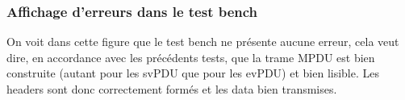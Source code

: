 \documentclass{report}
\begin{document}
\subsubsection{Affichage d'erreurs dans le test bench}
\label{subsection:NoErrors}
On voit dans cette figure que le test bench ne présente aucune erreur, cela veut dire, en accordance avec les précédents tests, que la trame MPDU est bien construite (autant pour les svPDU que pour les evPDU) et bien lisible. Les headers sont donc correctement formés et les data bien transmises.
\end{document}
